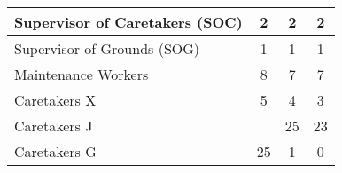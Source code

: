 \begin{tabular}{l|c|c|c|}
        \multicolumn{1}{|l|}{\cellcolor{ccfuschialight}Supervisor of Caretakers (SOC)} & 2                                                      & 2                                                                & 2                                                      \\ \hline
        \multicolumn{1}{|l|}{\cellcolor{ccfuschialight}Supervisor of Grounds (SOG)}    & 1                                                      & 1                                                                & 1                                                      \\ \hline
        \multicolumn{1}{|l|}{\cellcolor{ccfuschialight}Maintenance Workers}            & 8                                                      & 7                                                                & 7                                                       \\ \hline
        \multicolumn{1}{|l|}{\cellcolor{ccfuschialight}Caretakers X}                   & 5                                                      & 4                                                                & 3                                                      \\ \hline
        \multicolumn{1}{|l|}{\cellcolor{ccfuschialight}Caretakers J\tnote{2}}                   &                                                       & 25                                                                & 23                                                        \\ \cline{1-1} \cline{3-4}
        \multicolumn{1}{|l|}{\cellcolor{ccfuschialight}Caretakers G}                   & \multirow{-2}{*}{25}                                                      & 1                                     & 0                            \\ \hline
        \end{tabular}
        
        